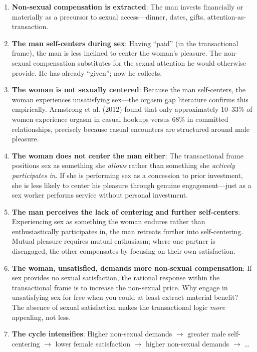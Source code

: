 \documentclass[12pt,openany]{book}
\numberwithin{equation}{chapter}
\begin{document}
\begin{enumerate}
    \item \textbf{Non-sexual compensation is extracted}: The man invests financially or materially as a precursor to sexual access---dinner, dates, gifts, attention-as-transaction.
    
    \item \textbf{The man self-centers during sex}: Having ``paid'' (in the transactional frame), the man is less inclined to center the woman's pleasure. The non-sexual compensation substitutes for the sexual attention he would otherwise provide. He has already ``given''; now he collects.
    
    \item \textbf{The woman is not sexually centered}: Because the man self-centers, the woman experiences unsatisfying sex---the orgasm gap literature confirms this empirically. Armstrong et al. (2012) found that only approximately 10--33\% of women experience orgasm in casual hookups versus 68\% in committed relationships, precisely because casual encounters are structured around male pleasure.
    
    \item \textbf{The woman does not center the man either}: The transactional frame positions sex as something she \textit{allows} rather than something she \textit{actively participates in}. If she is performing sex as a concession to prior investment, she is less likely to center his pleasure through genuine engagement---just as a sex worker performs service without personal investment.
    
    \item \textbf{The man perceives the lack of centering and further self-centers}: Experiencing sex as something the woman endures rather than enthusiastically participates in, the man retreats further into self-centering. Mutual pleasure requires mutual enthusiasm; where one partner is disengaged, the other compensates by focusing on their own satisfaction.
    
    \item \textbf{The woman, unsatisfied, demands more non-sexual compensation}: If sex provides no sexual satisfaction, the rational response within the transactional frame is to increase the non-sexual price. Why engage in unsatisfying sex for free when you could at least extract material benefit? The absence of sexual satisfaction makes the transactional logic \textit{more} appealing, not less.
    
    \item \textbf{The cycle intensifies}: Higher non-sexual demands $\rightarrow$ greater male self-centering $\rightarrow$ lower female satisfaction $\rightarrow$ higher non-sexual demands $\rightarrow$ \ldots
\end{enumerate}
\end{document}
